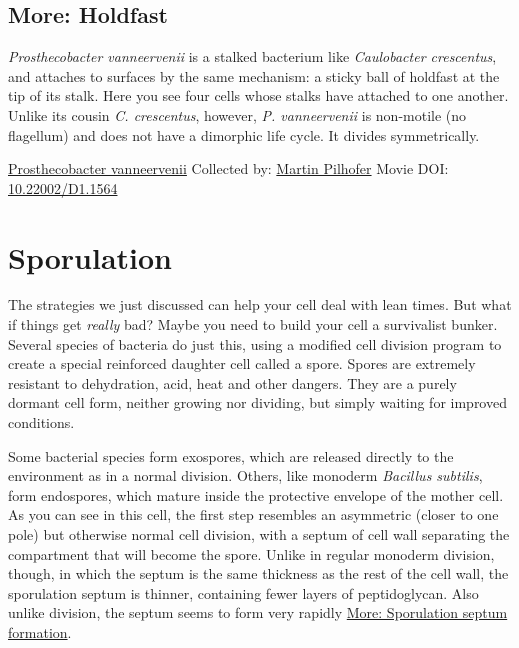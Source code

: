 \documentclass[]{tufte-book}
\begin{document}
\hypertarget{Holdfast}{%
\subsection*{More: Holdfast}\label{Holdfast}}

\emph{Prosthecobacter vanneervenii} is a stalked bacterium like \emph{Caulobacter crescentus}, and attaches to surfaces by the same mechanism: a sticky ball of holdfast at the tip of its stalk. Here you see four cells whose stalks have attached to one another. Unlike its cousin \emph{C. crescentus}, however, \emph{P. vanneervenii} is non-motile (no flagellum) and does not have a dimorphic life cycle. It divides symmetrically.



\hypertarget{htmlwidget-a317fbfd2af49de622e1}{}

\label{fig:8-4a}\protect\hyperlink{tree}{Prosthecobacter vanneervenii} Collected by: \protect\hyperlink{martin_pilhofer}{Martin Pilhofer} Movie DOI: \href{https://doi.org/10.22002/D1.1564}{10.22002/D1.1564}

\hypertarget{sporulation}{%
\section{Sporulation}\label{sporulation}}

The strategies we just discussed can help your cell deal with lean times. But what if things get \emph{really} bad? Maybe you need to build your cell a survivalist bunker. Several species of bacteria do just this, using a modified cell division program to create a special reinforced daughter cell called a spore. Spores are extremely resistant to dehydration, acid, heat and other dangers. They are a purely dormant cell form, neither growing nor dividing, but simply waiting for improved conditions.

Some bacterial species form exospores, which are released directly to the environment as in a normal division. Others, like monoderm \emph{Bacillus subtilis}, form endospores, which mature inside the protective envelope of the mother cell. As you can see in this cell, the first step resembles an asymmetric (closer to one pole) but otherwise normal cell division, with a septum of cell wall separating the compartment that will become the spore. Unlike in regular monoderm division, though, in which the septum is the same thickness as the rest of the cell wall, the sporulation septum is thinner, containing fewer layers of peptidoglycan. Also unlike division, the septum seems to form very rapidly \protect\hyperlink{Sporulation_septum_formation}{More: Sporulation septum formation}.
\end{document}
